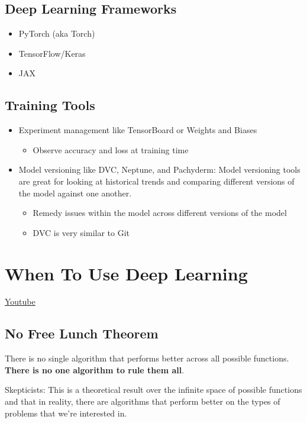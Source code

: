 \subsection{Deep Learning Frameworks}

\begin{itemize}
    \item PyTorch (aka Torch)
    \item TensorFlow/Keras
    \item JAX
\end{itemize}

\subsection{Training Tools}

\begin{itemize}
    \item Experiment management like TensorBoard or Weights and Biases
    \begin{itemize}
    \item Observe accuracy and loss at training time
    \end{itemize}
    \item Model versioning like DVC, Neptune, and Pachyderm: Model versioning tools are great for looking at historical trends and comparing different versions of the model against one another.
\begin{itemize}
        \item Remedy issues within the model across different versions of the model
        \item DVC is very similar to Git
\end{itemize}

\end{itemize}

\section{When To Use Deep Learning}
\href{https://www.youtube.com/watch?v=nYFmdOMXoz0&t=57s&ab_channel=Udacity}{Youtube}

\subsection{No Free Lunch Theorem}
There is no single algorithm that performs better across all possible functions. \textbf{There is no one algorithm to rule them all}.

Skepticists: This is a theoretical result over the infinite space of possible functions and that in reality, there are algorithms that perform better on the types of problems that we're interested in. 


